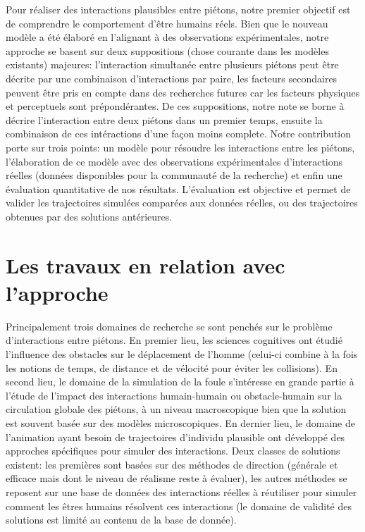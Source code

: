 \documentclass[11pt]{article}
\begin{document}
Pour réaliser des interactions plausibles entre piétons, notre premier objectif est de comprendre le comportement d'être humains réels. Bien que le nouveau modèle a été élaboré en l'alignant à des observations expérimentales, notre approche se basent sur deux suppositions (chose courante dans les modèles existants) majeures: l'interaction simultanée entre plusieurs piétons peut être décrite par une combinaison d'interactions par paire, les facteurs secondaires peuvent être pris en compte dans des recherches futures car les facteurs physiques et perceptuels sont prépondérantes. De ces suppositions, notre note se borne à décrire l'interaction entre deux piétons dans un premier temps, ensuite la combinaison de ces intéractions d'une façon moins complete. Notre contribution porte sur trois points: un modèle pour résoudre les interactions entre les piétons, l'élaboration de ce modèle avec des observations expérimentales d'interactions réelles (données disponibles pour la communauté de la recherche) et enfin une évaluation quantitative de nos résultats. L'évaluation est objective et permet de valider les trajectoires simulées comparées aux données réelles, ou des trajectoires obtenues par des solutions antérieures.

\section{Les travaux en relation avec l'approche}

Principalement trois domaines de recherche se sont penchés sur le problème d'interactions entre piétons. En premier lieu, les sciences cognitives ont étudié l'influence des obstacles sur le déplacement de l'homme (celui-ci combine à la fois les notions de temps, de distance et de vélocité pour éviter les collisions). En second lieu, le domaine de la simulation de la foule s'intéresse en grande partie à l'étude de l'impact des interactions humain-humain ou obstacle-humain sur la circulation globale des piétons, à un niveau macroscopique bien que la solution est souvent basée sur des modèles microscopiques. En dernier lieu, le domaine de l'animation ayant besoin de trajectoires d'individu plausible ont développé des approches spécifiques pour simuler des interactions. Deux classes de solutions existent: les premières sont basées sur des méthodes de direction (générale et efficace mais dont le niveau de réalisme reste à évaluer), les autres méthodes se reposent sur une base de données des interactions réelles à réutiliser pour simuler comment les êtres humains résolvent ces interactions (le domaine de validité des solutions est limité au contenu de la base de donnée).
\end{document}
